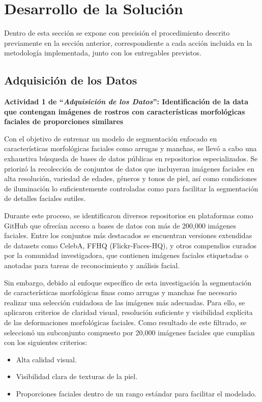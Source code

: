 \chapter{Desarrollo de la Solución}
Dentro de esta sección se expone con precisión el procedimiento descrito previamente en la sección anterior, correspondiente a cada acción incluida en la metodología implementada, junto con los entregables previstos.

\section{Adquisición de los Datos}

\textbf{Actividad 1 de “\textit{Adquisición de los Datos}”: Identificación de la data que contengan imágenes de rostros con características morfológicas faciales de proporciones similares}
 
Con el objetivo de entrenar un modelo de segmentación enfocado en características morfológicas faciales como arrugas y manchas, se llevó a cabo una exhaustiva búsqueda de bases de datos públicas en repositorios especializados. Se priorizó la recolección de conjuntos de datos que incluyeran imágenes faciales en alta resolución, variedad de edades, géneros y tonos de piel, así como condiciones de iluminación lo suficientemente controladas como para facilitar la segmentación de detalles faciales sutiles.

Durante este proceso, se identificaron diversos repositorios en plataformas como GitHub que ofrecían acceso a bases de datos con más de 200,000 imágenes faciales. Entre los conjuntos más destacados se encuentran versiones extendidas de datasets como CelebA, FFHQ (Flickr-Faces-HQ), y otros compendios curados por la comunidad investigadora, que contienen imágenes faciales etiquetadas o anotadas para tareas de reconocimiento y análisis facial.

Sin embargo, debido al enfoque específico de esta investigación la segmentación de características morfológicas finas como arrugas y manchas fue necesario realizar una selección cuidadosa de las imágenes más adecuadas. Para ello, se aplicaron criterios de claridad visual, resolución suficiente y visibilidad explícita de las deformaciones morfológicas faciales. Como resultado de este filtrado, se seleccionó un subconjunto compuesto por 20,000 imágenes faciales que cumplían con los siguientes criterios:

\begin{itemize}
    \item Alta calidad visual.   
    \item Visibilidad clara de texturas de la piel.
    \item Proporciones faciales dentro de un rango estándar para facilitar el modelado.
\end{itemize} 

